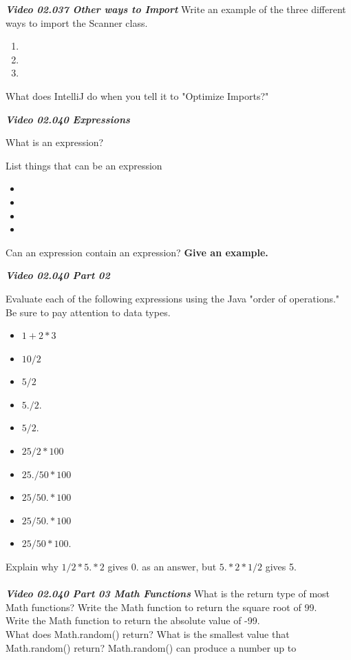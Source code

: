 \documentclass[letterpaper,11pt]{exam}
\newcommand{\videoheading}[1]{\Large\textbf{\textit{#1}}}
\begin{document}
\begin{questions}
\begin{samepage}
\videoheading{Video 02.037 Other ways to Import}
\question Write an example of the three different ways to import the Scanner class.
\begin{enumerate}
  \item
  \item
  \item
\end{enumerate}
\end{samepage}
\question What does IntelliJ do when you tell it to "Optimize Imports?"
\vspace{1cm}

\videoheading{Video 02.040 Expressions}

\question What is an expression?
\begin{samepage}
\question List things that can be an expression
\begin{itemize}
  \item 
  \item 
  \item 
  \item 
\end{itemize}
\end{samepage}
\question Can an expression contain an expression?  \textbf{Give an example.}


\videoheading{Video 02.040 Part 02}
\begin{samepage}
\question Evaluate each of the following expressions using the Java "order of operations."  Be sure to pay attention to data types.
\begin{itemize}
  \item$1+2*3$
  \item$10/2$
  \item $5/2$
  \item $5./2.$
  \item $5/2.$
  \item $25/2*100$
  \item $25./50*100$
  \item $25/50.*100$
  \item $25/50.*100$
  \item $25/50*100.$
\end{itemize}
\end{samepage}
\question Explain why $1/2 * 5. * 2$ gives 0. as an answer, but $5. * 2 * 1/2$ gives 5.
\vspace{1cm}
\\\\
\videoheading{Video 02.040 Part 03 Math Functions}
\question What is the return type of most Math functions?
\question Write the Math function to return the square root of 99.
\\
\question Write the Math function to return the absolute value of -99.
\\
\question What does Math.random() return?
\question What is the smallest value that Math.random() return?
\question Math.random() can produce a number up to \hrulefill


\end{questions}
\end{document}
